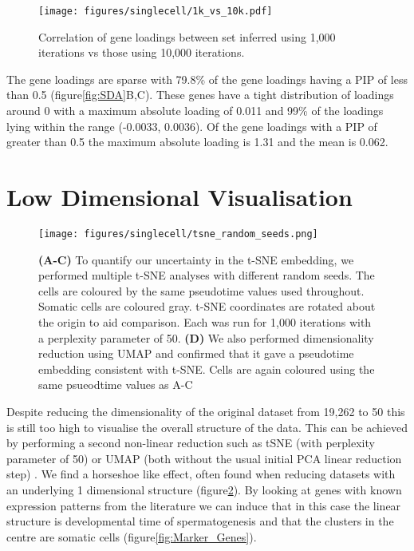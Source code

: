 \begin{figure}[H]
	\centering
	\texttt{[image: figures/singlecell/1k\_vs\_10k.pdf]}
	\caption[10k vs 1k SDA Iterations]{Correlation of gene loadings between set inferred using 1,000 iterations vs those using 10,000 iterations.}
	\label{fig:10k}
\end{figure}

The gene loadings are sparse with 79.8\% of the gene loadings having a PIP of less than 0.5 (figure\ref{fig:SDA}B,C). These genes have a tight distribution of loadings around 0 with a maximum absolute loading of 0.011 and 99\% of the loadings lying within the range (-0.0033, 0.0036). Of the gene loadings with a PIP of greater than 0.5 the maximum absolute loading is 1.31 and the mean is 0.062.

\section{Low Dimensional Visualisation}

\begin{figure}[H]
	\centering
	\texttt{[image: figures/singlecell/tsne\_random\_seeds.png]}
	\caption[tSNE random seed stability]{
		\textbf{(A-C)} To quantify our uncertainty in the t-SNE embedding, we performed multiple t-SNE analyses with different random seeds. The cells are coloured by the same pseudotime values used throughout. Somatic cells are coloured gray. t-SNE coordinates are rotated about the origin to aid comparison. Each was run for 1,000 iterations with a perplexity parameter of 50.
		\textbf{(D)} We also performed dimensionality reduction using UMAP and confirmed that it gave a pseudotime embedding consistent with t-SNE. Cells are again coloured using the same psueodtime values as A-C}
	\label{fig:tSNEseeds}
\end{figure}

Despite reducing the dimensionality of the original dataset from 19,262 to 50 this is still too high to visualise the overall structure of the data. This can be achieved by performing a second non-linear reduction such as tSNE (with perplexity parameter of 50) or UMAP (both without the usual initial PCA linear reduction step) \parencite{Maaten2008Visualizing, McInnes2018UMAPa, Becht2018Dimensionality}. We find a horseshoe like effect, often found when reducing datasets with an underlying 1 dimensional structure \parencite{Novembre2008Interpreting, Podani2002RESEMBLANCE} (figure\ref{fig:tSNEseeds}). By looking at genes with known expression patterns from the literature we can induce that in this case the linear structure is developmental time of spermatogenesis and that the clusters in the centre are somatic cells (figure\ref{fig:Marker_Genes}).


